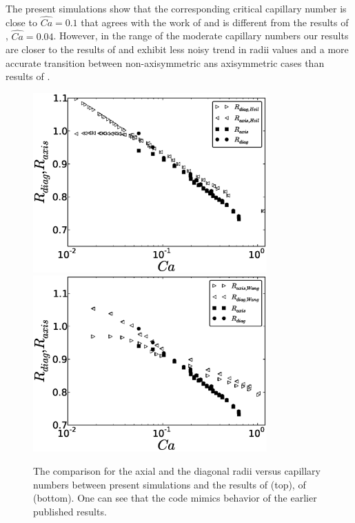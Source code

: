 \documentclass[preprint,12pt]{elsarticle}
\begin{document}
The present simulations show that the corresponding critical capillary number is close to
$\widehat{Ca}=0.1$ that agrees with the work of \citet{wang-non-circular} and is different from the
results of \citet{heil-threedim}, $\widehat{Ca}=0.04$. However, in the range of the moderate
capillary numbers our results are closer to the results of \citet{heil-threedim} and exhibit
less noisy trend in radii values and a more accurate transition between non-axisymmetric ans
axisymmetric cases than results of \citet{wang-non-circular}. 
\begin{figure}[ht]
\includegraphics[width=0.8\textwidth]{Figures/capillaries_comparison_heil.eps}\\
\includegraphics[width=0.8\textwidth]{Figures/capillaries_comparison_wang.eps}\\
\caption{The comparison for the axial and the diagonal radii
versus capillary numbers between present simulations and the results of \citet{heil-threedim}
(top), of \citet{wang-non-circular} (bottom). One can see that
the code mimics
behavior of the earlier published results.  \label{fig:capillary:comparison}} 
\end{figure}
\end{document}
